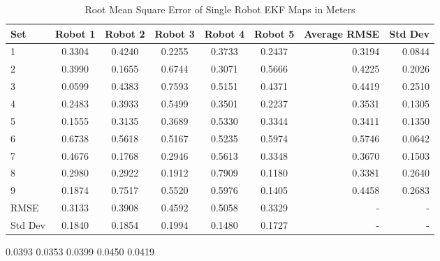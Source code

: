 \documentclass[12pt]{report}
\begin{document}
\begin{center}
\begin{table}[h]
  \caption{Root Mean Square Error of Single Robot EKF Maps in Meters}
  \begin{tabular}{| l | c | c | c | c | c || r ||r |}
    \hline
     Set & Robot 1 & Robot 2 & Robot 3 & Robot 4 & Robot 5 & Average RMSE & Std Dev \\ \hline \hline
     1 & 0.3304 & 0.4240 & 0.2255 & 0.3733 & 0.2437 & 0.3194 & 0.0844\\ \hline
     2 & 0.3990 & 0.1655 & 0.6744 & 0.3071 & 0.5666 & 0.4225 & 0.2026\\ \hline
     3 & 0.0599 & 0.4383 & 0.7593 & 0.5151 & 0.4371 & 0.4419 & 0.2510\\ \hline
     4 & 0.2483 & 0.3933 & 0.5499 & 0.3501 & 0.2237 & 0.3531 & 0.1305\\ \hline
     5 & 0.1555 & 0.3135 & 0.3689 & 0.5330 & 0.3344 & 0.3411 & 0.1350\\ \hline
     6 & 0.6738 & 0.5618 & 0.5167 & 0.5235 & 0.5974 & 0.5746 & 0.0642\\ \hline
     7 & 0.4676 & 0.1768 & 0.2946 & 0.5613 & 0.3348 & 0.3670 & 0.1503\\ \hline
     8 & 0.2980 & 0.2922 & 0.1912 & 0.7909 & 0.1180 & 0.3381 & 0.2640\\ \hline
     9 & 0.1874 & 0.7517 & 0.5520 & 0.5976 & 0.1405 & 0.4458 & 0.2683\\ \hline
    \hline
    RMSE & 0.3133 & 0.3908 & 0.4592 & 0.5058 & 0.3329 & - & -\\ \hline
    Std Dev & 0.1840 & 0.1854 & 0.1994 & 0.1480 & 0.1727 & - & -\\ \hline
    \hline
  \end{tabular}
  \end{table}
\end{center}
    0.0393
    0.0353
    0.0399
    0.0450
    0.0419
\end{document}
